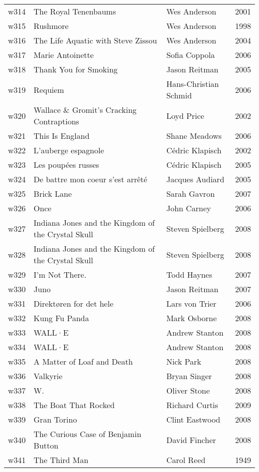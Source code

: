 \documentclass{article}
\begin{document}
\begin {center}
\begin{longtable}{l p{10cm} l l}
w314 & The Royal Tenenbaums & Wes Anderson & 2001 \\
w315 & Rushmore & Wes Anderson & 1998 \\
w316 & The Life Aquatic with Steve Zissou & Wes Anderson & 2004 \\
w317 & Marie Antoinette & Sofia Coppola & 2006 \\
w318 & Thank You for Smoking & Jason Reitman & 2005 \\
w319 & Requiem & Hans-Christian Schmid & 2006 \\
w320 & Wallace \& Gromit's Cracking Contraptions & Loyd Price & 2002 \\
w321 & This Is England & Shane Meadows & 2006 \\
w322 & L'auberge espagnole & Cédric Klapisch & 2002 \\
w323 & Les poupées russes & Cédric Klapisch & 2005 \\
w324 & De battre mon coeur s'est arrêté & Jacques Audiard & 2005 \\
w325 & Brick Lane & Sarah Gavron & 2007 \\
w326 & Once & John Carney & 2006 \\
w327 & Indiana Jones and the Kingdom of the Crystal Skull & Steven Spielberg & 2008 \\
w328 & Indiana Jones and the Kingdom of the Crystal Skull & Steven Spielberg & 2008 \\
w329 & I'm Not There. & Todd Haynes & 2007 \\
w330 & Juno & Jason Reitman & 2007 \\
w331 & Direktøren for det hele & Lars von Trier & 2006 \\
w332 & Kung Fu Panda & Mark Osborne & 2008 \\
w333 & WALL·E & Andrew Stanton & 2008 \\
w334 & WALL·E & Andrew Stanton & 2008 \\
w335 & A Matter of Loaf and Death & Nick Park & 2008 \\
w336 & Valkyrie & Bryan Singer & 2008 \\
w337 & W. & Oliver Stone & 2008 \\
w338 & The Boat That Rocked & Richard Curtis & 2009 \\
w339 & Gran Torino & Clint Eastwood & 2008 \\
w340 & The Curious Case of Benjamin Button & David Fincher & 2008 \\
w341 & The Third Man & Carol Reed & 1949 \\

\end{longtable}
\end{center}
\end{document}
